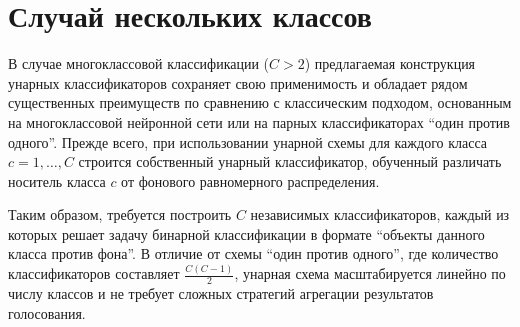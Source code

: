 \section{Случай нескольких классов}

В случае многоклассовой классификации (\(C > 2\)) предлагаемая конструкция унарных классификаторов сохраняет свою применимость и обладает рядом существенных преимуществ по сравнению с классическим подходом, основанным на многоклассовой нейронной сети или на парных классификаторах ``один против одного''. Прежде всего, при использовании унарной схемы для каждого класса \(c = 1, \dots, C\) строится собственный унарный классификатор, обученный различать носитель класса \(c\) от фонового равномерного распределения.

Таким образом, требуется построить \(C\) независимых классификаторов, каждый из которых решает задачу бинарной классификации в формате ``объекты данного класса против фона''. В отличие от схемы ``один против одного'', где количество классификаторов составляет \(\frac{C(C - 1)}{2}\), унарная схема масштабируется линейно по числу классов и не требует сложных стратегий агрегации результатов голосования.
